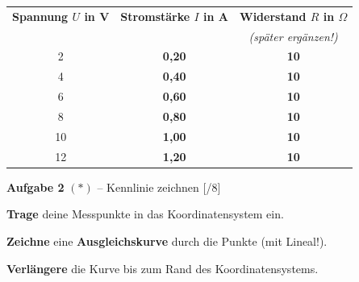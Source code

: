 \documentclass[11pt, a4paper]{article}
\newcommand{\loes}[1]{\textcolor{loesung}{\textbf{#1}}}
\newcommand{\punktebox}[1]{\hfill\small\textcolor{mittelgrau}{[\hspace{0.8em}/#1]}}
\newcommand{\aufgabe}[2]{%
    \needspace{4\baselineskip}%
    \vspace{8pt}%
    \noindent\textbf{\textcolor{fachfarbe}{Aufgabe #1}} #2%
    \vspace{4pt}%
    \nopagebreak[4]%
}
\newcommand{\operator}[1]{\textbf{#1}}
\begin{document}
\vspace{0.5em}
\begin{center}
\begin{tabular}{|c|c||c|}
\hline
\textbf{Spannung $U$ in V} & \textbf{Stromstärke $I$ in A} & \textbf{Widerstand $R$ in $\Omega$} \\
& & \textit{\footnotesize (später ergänzen!)} \\
\hline
2 & \loes{0,20} & \loes{10} \\[0.5em]
\hline
4 & \loes{0,40} & \loes{10} \\[0.5em]
\hline
6 & \loes{0,60} & \loes{10} \\[0.5em]
\hline
8 & \loes{0,80} & \loes{10} \\[0.5em]
\hline
10 & \loes{1,00} & \loes{10} \\[0.5em]
\hline
12 & \loes{1,20} & \loes{10} \\[0.5em]
\hline
\end{tabular}
\end{center}


\aufgabe{2}{$(*)$ – Kennlinie zeichnen} \punktebox{8}

\begin{teil}
    \item \operator{Trage} deine Messpunkte in das Koordinatensystem ein.
    \item \operator{Zeichne} eine \textbf{Ausgleichskurve} durch die Punkte (mit Lineal!).
    \item \operator{Verlängere} die Kurve bis zum Rand des Koordinatensystems.
\end{teil}
\end{document}
